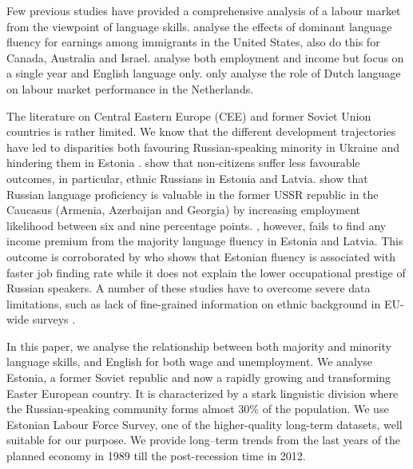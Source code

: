 \documentclass[12pt, a4paper]{article}
\begin{document}
Few previous studies have provided a comprehensive analysis of a labour
market from the viewpoint of language skills.
\citet{Chiswick1995, chiswick+miller2002, chiswick+miller2007,
 Bellante1998, Chiswick2010} analyse the effects of dominant language
fluency for earnings among immigrants in the United States, 
\citet{Chiswick1995} also do this for Canada, Australia and Israel.
\citet{leslie+lindley2001} analyse both employment and income but
focus on a single year and English language only.
\citet{YaoandOurs2015} only analyse the role of Dutch language
on labour market performance in the Netherlands. 

The literature on Central Eastern Europe (CEE) and former Soviet Union
countries is rather limited. We know that the different development
trajectories have led to disparities both favouring Russian-speaking
minority in Ukraine \citep{Constant2011} and hindering them in Estonia
\citep{Leping2008}. \citet{Kahanec2009} show that non-citizens suffer
less favourable outcomes, in particular, ethnic Russians in Estonia and
Latvia. 
\cite{Alan2015} show that Russian language proficiency is valuable in
the former USSR republic in the Caucasus (Armenia, Azerbaijan and
Georgia) by increasing employment likelihood between six and nine
percentage points. \citet{Toomet2011}, however, fails to find any
income premium from the majority language fluency in Estonia and
Latvia. This outcome is corroborated by \citet{Lindemann2013} who shows that Estonian fluency
is associated with faster job finding rate while it does not
explain the lower occupational prestige of Russian speakers. 
A number of these studies have to overcome severe data limitations,
such as lack of fine-grained information on ethnic background in
EU-wide surveys \citep{Kahanec2010}.

In this paper, we analyse the relationship between both
majority and minority language skills, and English for both
wage and unemployment. We analyse Estonia, a former Soviet republic
and now a rapidly growing and
transforming Easter European country. It is characterized by a stark linguistic division
where the Russian-speaking community forms almost 30\% of
the population. We use Estonian Labour Force Survey, one of the
higher-quality long-term datasets, well suitable for our
purpose. We provide long--term trends from the last years
of the planned economy in 1989 till the post-recession time in 2012.
\end{document}
